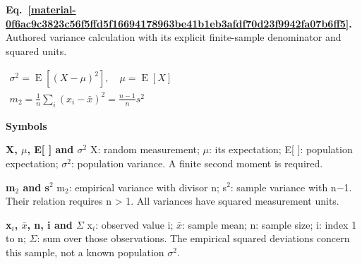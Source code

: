 \documentclass[11pt,a4paper]{article}
\begin{document}
\begin{landscape}
{}

\medskip
\end{landscape}

\par\medskip
\begin{samepage}
\label{material-0f6ac9c3823c56f5ffd5f16694178963be41b1eb3afdf70d23f9942fa07b6ff5}
\noindent\textbf{Eq.~\ref*{material-0f6ac9c3823c56f5ffd5f16694178963be41b1eb3afdf70d23f9942fa07b6ff5}.} Authored variance calculation with its explicit finite-sample denominator and squared units.\par\nopagebreak
\begin{center}\begin{adjustbox}{max width=\linewidth}$\displaystyle \begin{gathered}\sigma^2=\operatorname{E}[(X-\mu)^2],\quad\mu=\operatorname{E}[X]\\m_2=\frac1n\sum_i(x_i-\bar{x})^2=\frac{n-1}{n}s^2\end{gathered}$\end{adjustbox}\end{center}

\par\noindent\textbf{Symbols}

\par\noindent\textbf{X, \ensuremath{\mu}, E[ ] and \ensuremath{\sigma}\ensuremath{{}^2}} X: random measurement; \ensuremath{\mu}: its expectation; E[ ]: population expectation; \ensuremath{\sigma}\ensuremath{{}^2}: population variance. A finite second moment is required.

\par\noindent\textbf{m\ensuremath{{}_2} and s\ensuremath{{}^2}} m\ensuremath{{}_2}: empirical variance with divisor n; s\ensuremath{{}^2}: sample variance with n\ensuremath{-}1. Their relation requires n > 1. All variances have squared measurement units.

\par\noindent\textbf{x\ensuremath{{}_i}, \ensuremath{\bar{x}}, n, i and \ensuremath{\Sigma}} x\ensuremath{{}_i}: observed value i; \ensuremath{\bar{x}}: sample mean; n: sample size; i: index 1 to n; \ensuremath{\Sigma}: sum over those observations. The empirical squared deviations concern this sample, not a known population \ensuremath{\sigma}\ensuremath{{}^2}.

\end{samepage}
\medskip
\end{document}
